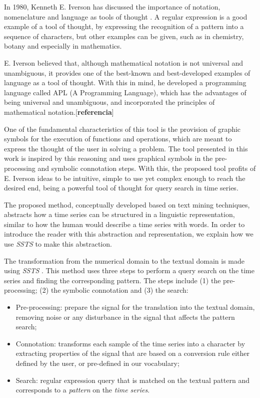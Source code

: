 In 1980, Kenneth E. Iverson has discussed the importance of notation, nomenclature and language as tools of thought \citep{APL1}. A regular expression is a good example of a tool of thought, by expressing the recognition of a pattern into a sequence of characters, but other examples can be given, such as in chemistry, botany and especially in mathematics. 
\par
E. Iverson believed that, although mathematical notation is not universal and unambiguous, it provides one of the best-known and best-developed examples of language as a tool of thought. With this in mind, he developed a programming language called APL (A Programming Language), which has the advantages of being universal and unambiguous, and incorporated the principles of mathematical notation.[\textbf{referencia}]
\par
One of the fundamental characteristics of this tool is the provision of graphic symbols for the execution of functions and operations, which are meant to express the thought of the user in solving a problem. The tool presented in this work is inspired by this reasoning and uses graphical symbols in the pre-processing and symbolic connotation steps. With this, the proposed tool profits of E. Iverson ideas to be intuitive, simple to use yet complex enough to reach the desired end, being a powerful tool of thought for query search in time series. 

The proposed method, conceptually developed based on text mining techniques, abstracts how a time series can be structured in a linguistic representation, similar to how the human would describe a time series with words. In order to introduce the reader with this abstraction and representation, we explain how we use \textit{SSTS} to make this abstraction.
\par
The transformation from the numerical domain to the textual domain is made using \textit{SSTS} \cite{ssts}. This method uses three steps to perform a query search on the time series and finding the corresponding pattern. The steps include (1) the pre-processing; (2) the symbolic connotation and (3) the search:

\begin{itemize}
    \item Pre-processing: prepare the signal for the translation into the textual domain, removing noise or any disturbance in the signal that affects the pattern search;
    \item Connotation: transforms each sample of the time series into a character by extracting properties of the signal that are based on a conversion rule either defined by the user, or pre-defined in our vocabulary; 
    \item Search: regular expression query that is matched on the textual pattern and corresponds to a \textit{pattern} on the \textit{time series}.
\end{itemize}

